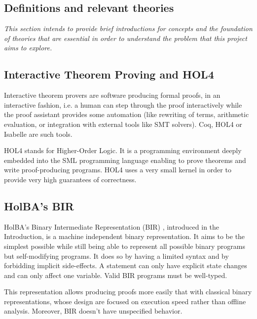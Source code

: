 \documentclass[10pt,a4paper]{article}
\begin{document}
\begin{multicols}{2}

\section{Definitions and relevant theories}
\textit{This section intends to provide brief introductions for concepts and the foundation of theories that are essential in order to understand the problem that this project aims to explore.}

\subsection{Interactive Theorem Proving and HOL4} \label{hol4-presentation}

Interactive theorem provers are software producing formal proofs, in an
interactive fashion, i.e. a human can step through the proof interactively while the proof assistant provides some automation (like rewriting of terms, arithmetic evaluation, or integration with external tools like SMT solvers). Coq, HOL4 or Isabelle are such tools.

HOL4 stands for Higher-Order Logic. It is a programming environment deeply embedded into the {SML} programming language enabling to prove theorems and write {proof-producing} programs. HOL4 uses a very small kernel in order to provide very high guarantees of correctness.


\subsection{HolBA's BIR} \label{bir-presentation}

HolBA's Binary Intermediate Representation (BIR) \cite{lindner_trabin:_2019}, introduced in the Introduction, is a machine independent binary representation. It aims to be the simplest possible while still being able to represent all possible binary programs but self-modifying programs. It does so by having a limited syntax and by forbidding implicit side-effects. A statement can only have explicit state changes and can only affect one variable. Valid BIR programs must be well-typed.

This representation allows producing proofs more easily that with classical binary representations, whose design are focused on execution speed rather than offline analysis. Moreover, BIR doesn't have unspecified behavior.


\end{multicols}
\end{document}
